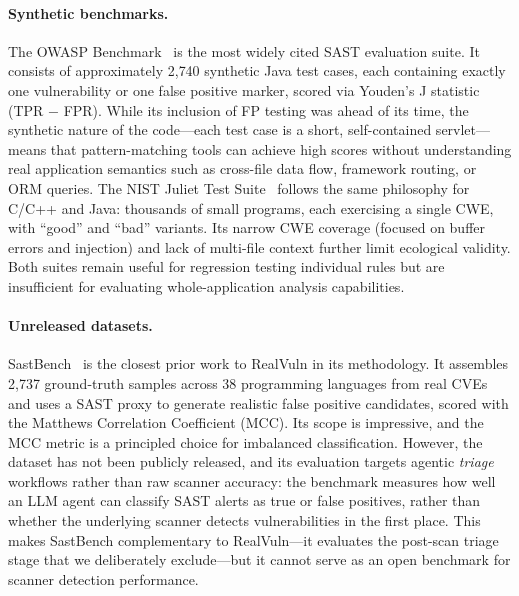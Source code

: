 \paragraph{Synthetic benchmarks.}
The OWASP Benchmark~\cite{owaspbenchmark} is the most widely cited SAST
evaluation suite. It consists of approximately 2{,}740 synthetic Java test
cases, each containing exactly one vulnerability or one false positive marker,
scored via Youden's J statistic (TPR $-$ FPR). While its inclusion of FP
testing was ahead of its time, the synthetic nature of the code---each test
case is a short, self-contained servlet---means that pattern-matching tools
can achieve high scores without understanding real application semantics such
as cross-file data flow, framework routing, or ORM queries. The NIST Juliet
Test Suite~\cite{boland2012juliet} follows the same philosophy for C/C++ and
Java: thousands of small programs, each exercising a single CWE, with ``good''
and ``bad'' variants. Its narrow CWE coverage (focused on buffer errors and
injection) and lack of multi-file context further limit ecological validity.
Both suites remain useful for regression testing individual rules but are
insufficient for evaluating whole-application analysis capabilities.

\paragraph{Unreleased datasets.}
SastBench~\cite{feiglin2026sastbench} is the closest prior work to RealVuln in
its methodology. It assembles 2{,}737 ground-truth samples across 38
programming languages from real CVEs and uses a SAST proxy to generate
realistic false positive candidates, scored with the Matthews Correlation
Coefficient (MCC). Its scope is impressive, and the MCC metric is a principled
choice for imbalanced classification. However, the dataset has not been
publicly released, and its evaluation targets agentic \emph{triage} workflows
rather than raw scanner accuracy: the benchmark measures how well an LLM agent
can classify SAST alerts as true or false positives, rather than whether the
underlying scanner detects vulnerabilities in the first place. This makes
SastBench complementary to RealVuln---it evaluates the post-scan triage stage
that we deliberately exclude---but it cannot serve as an open benchmark for
scanner detection performance.

